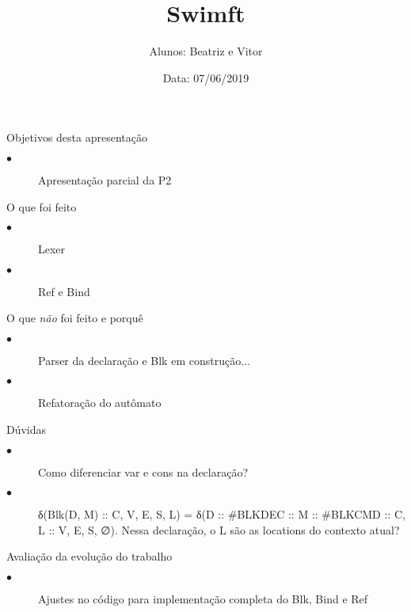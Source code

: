 \documentclass{beamer}
\title[Compiladores 2017.2]{Swimft}
\author[Abrev.]{Alunos: Beatriz e Vitor}
\institute[UFF]{Universidade Federal Fluminense}
\date{Data: 07/06/2019}
\begin{document}

\begin{frame}[plain]

\titlepage

\end{frame}


\begin{frame}{Objetivos desta apresentação}
\begin{description}
  \item[$\bullet$] Apresentação parcial da P2
\end{description}
\end{frame}


\begin{frame}{O que foi feito}
\begin{description}
  \item[$\bullet$] Lexer
  \item[$\bullet$] Ref e Bind
\end{description}
\end{frame}


\begin{frame}{O que \emph{não} foi feito e porquê}
\begin{description}
  \item[$\bullet$] Parser da declaração e Blk em construção...
  \item[$\bullet$] Refatoração do autômato
\end{description}

\end{frame}


\begin{frame}{Dúvidas}
\begin{description}
  \item[$\bullet$] Como diferenciar var e cons na declaração?
  \item[$\bullet$] δ(Blk(D, M) :: C, V, E, S, L) = δ(D :: #BLKDEC :: M :: #BLKCMD :: C, L :: V, E, S, ∅). Nessa declaração, o L são as locations do contexto atual?
\end{description}
\end{frame}


\begin{frame}{Avaliação da evolução do trabalho}
\begin{description}
  \item[$\bullet$] Ajustes no código para implementação completa do Blk, Bind e Ref
\end{description}

\end{frame}
\end{document}
